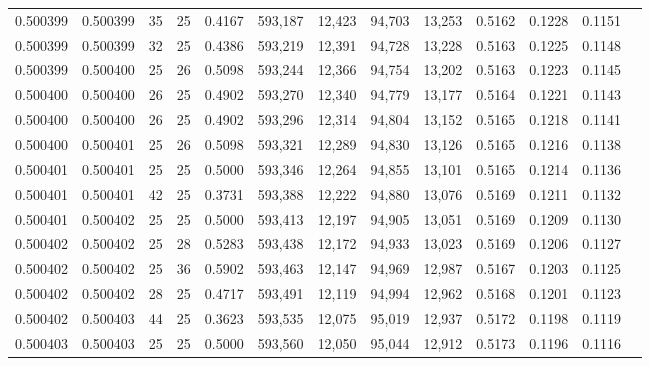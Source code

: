 \begin{tabular}{rrrrrrrrrrrrr}
0.500399 & 0.500399 &    35 &  25 &                                     0.4167 & 593,187 &  12,423 &  94,703 &  13,253 & 0.5162 & 0.1228 & 0.1151 \\
0.500399 & 0.500399 &    32 &  25 &                                     0.4386 & 593,219 &  12,391 &  94,728 &  13,228 & 0.5163 & 0.1225 & 0.1148 \\
0.500399 & 0.500400 &    25 &  26 &                                     0.5098 & 593,244 &  12,366 &  94,754 &  13,202 & 0.5163 & 0.1223 & 0.1145 \\
0.500400 & 0.500400 &    26 &  25 &                                     0.4902 & 593,270 &  12,340 &  94,779 &  13,177 & 0.5164 & 0.1221 & 0.1143 \\
0.500400 & 0.500400 &    26 &  25 &                                     0.4902 & 593,296 &  12,314 &  94,804 &  13,152 & 0.5165 & 0.1218 & 0.1141 \\
0.500400 & 0.500401 &    25 &  26 &                                     0.5098 & 593,321 &  12,289 &  94,830 &  13,126 & 0.5165 & 0.1216 & 0.1138 \\
0.500401 & 0.500401 &    25 &  25 &                                     0.5000 & 593,346 &  12,264 &  94,855 &  13,101 & 0.5165 & 0.1214 & 0.1136 \\
0.500401 & 0.500401 &    42 &  25 &                                     0.3731 & 593,388 &  12,222 &  94,880 &  13,076 & 0.5169 & 0.1211 & 0.1132 \\
0.500401 & 0.500402 &    25 &  25 &                                     0.5000 & 593,413 &  12,197 &  94,905 &  13,051 & 0.5169 & 0.1209 & 0.1130 \\
0.500402 & 0.500402 &    25 &  28 &                                     0.5283 & 593,438 &  12,172 &  94,933 &  13,023 & 0.5169 & 0.1206 & 0.1127 \\
0.500402 & 0.500402 &    25 &  36 &                                     0.5902 & 593,463 &  12,147 &  94,969 &  12,987 & 0.5167 & 0.1203 & 0.1125 \\
0.500402 & 0.500402 &    28 &  25 &                                     0.4717 & 593,491 &  12,119 &  94,994 &  12,962 & 0.5168 & 0.1201 & 0.1123 \\
0.500402 & 0.500403 &    44 &  25 &                                     0.3623 & 593,535 &  12,075 &  95,019 &  12,937 & 0.5172 & 0.1198 & 0.1119 \\
0.500403 & 0.500403 &    25 &  25 &                                     0.5000 & 593,560 &  12,050 &  95,044 &  12,912 & 0.5173 & 0.1196 & 0.1116 \\

\end{tabular}
